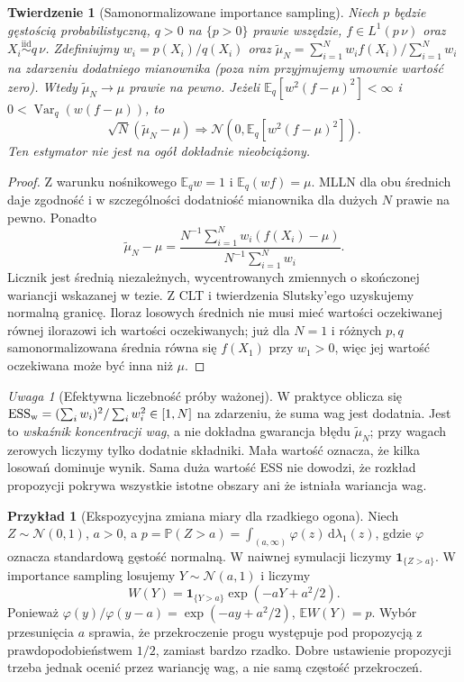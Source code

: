 \documentclass[11pt,a4paper,oneside]{report}
\numberwithin{equation}{chapter}
\theoremstyle{plain}
\newtheorem{twierdzenie}{Twierdzenie}[chapter]
\theoremstyle{definition}
\newtheorem{przyklad}{Przykład}[chapter]
\theoremstyle{remark}
\newtheorem{uwaga}{Uwaga}[chapter]
\newcommand{\Prob}{\mathbb P}
\newcommand{\E}{\mathbb E}
\newcommand{\Var}{\operatorname{Var}}
\newcommand{\ind}[1]{\mathbf 1_{#1}}
\newcommand{\dd}{\mathrm d}
\newcommand{\Normal}{\mathcal N}
\newcommand{\iid}{\mathrel{\overset{\mathrm{iid}}\sim}}
\begin{document}
\begin{twierdzenie}[Samonormalizowane importance sampling]
\label{thm:sn-is}
Niech $p$ będzie gęstością probabilistyczną,
$q>0$ na $\{p>0\}$ prawie wszędzie,
$f\in L^1(p\,\nu)$ oraz $X_i\iid q\,\nu$.
Zdefiniujmy $w_i=p(X_i)/q(X_i)$ oraz
$\widetilde\mu_N=\sum_{i=1}^Nw_i f(X_i)/\sum_{i=1}^Nw_i$
na zdarzeniu dodatniego mianownika (poza nim przyjmujemy
umownie wartość zero). Wtedy
$\widetilde\mu_N\to\mu$ prawie na pewno.
Jeżeli $\E_q[w^2(f-\mu)^2]<\infty$ i
$0<\Var_q(w(f-\mu))$, to
\[
 \sqrt N(\widetilde\mu_N-\mu)
 \Rightarrow\Normal\left(0,\E_q[w^2(f-\mu)^2]\right).
\]
Ten estymator nie jest na ogół dokładnie nieobciążony.
\end{twierdzenie}
\begin{proof}
Z warunku nośnikowego $\E_q w=1$ i
$\E_q(wf)=\mu$. MLLN dla obu średnich daje zgodność i
w szczególności dodatniość mianownika dla dużych $N$
prawie na pewno. Ponadto
\[
 \widetilde\mu_N-\mu=
 \frac{N^{-1}\sum_{i=1}^N w_i(f(X_i)-\mu)}
      {N^{-1}\sum_{i=1}^N w_i}.
\]
Licznik jest średnią niezależnych, wycentrowanych
zmiennych o skończonej wariancji wskazanej w tezie.
Z CLT i twierdzenia Slutsky'ego uzyskujemy normalną granicę.
Iloraz losowych średnich nie musi mieć wartości oczekiwanej
równej ilorazowi ich wartości oczekiwanych; już dla $N=1$
i różnych $p,q$ samonormalizowana średnia równa się
$f(X_1)$ przy $w_1>0$, więc jej wartość oczekiwana
może być inna niż $\mu$.
\end{proof}

\begin{uwaga}[Efektywna liczebność próby ważonej]
W praktyce oblicza się
$\mathrm{ESS}_{\rm w}=(\sum_iw_i)^2/\sum_iw_i^2\in[1,N]$
na zdarzeniu, że suma wag jest dodatnia.
Jest to \emph{wskaźnik koncentracji wag}, a nie dokładna
gwarancja błędu $\widetilde\mu_N$; przy wagach zerowych
liczymy tylko dodatnie składniki. Mała wartość oznacza,
że kilka losowań dominuje wynik. Sama duża wartość ESS
nie dowodzi, że rozkład propozycji pokrywa wszystkie
istotne obszary ani że istniała wariancja wag.
\end{uwaga}

\begin{przyklad}[Ekspozycyjna zmiana miary dla rzadkiego ogona]
Niech $Z\sim\Normal(0,1)$, $a>0$, a
$p=\Prob(Z>a)=\int_{(a,\infty)}\varphi(z)\,\dd\lambda_1(z)$,
gdzie $\varphi$ oznacza standardową gęstość normalną.
W naiwnej symulacji liczymy $\ind{\{Z>a\}}$.
W importance sampling losujemy $Y\sim\Normal(a,1)$ i liczymy
\[
 W(Y)=\ind{\{Y>a\}}\exp(-aY+a^2/2).
\]
Ponieważ $\varphi(y)/\varphi(y-a)=\exp(-ay+a^2/2)$,
$\E W(Y)=p$. Wybór przesunięcia $a$ sprawia, że
przekroczenie progu występuje pod propozycją
z prawdopodobieństwem $1/2$, zamiast bardzo rzadko.
Dobre ustawienie propozycji trzeba jednak ocenić przez
wariancję wag, a nie samą częstość przekroczeń.
\end{przyklad}
\end{document}
